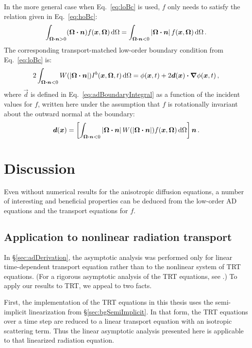 In the more general case when Eq.~\eqref{eq:loBc} is used, $f$ only needs to
satisfy the relation given in Eq.~\eqref{eq:hoBc}:
\begin{equation*}
  \int_{\bm{\Omega}\bm{\cdot}\bm{n} > 0} (\bm{\Omega}\bm{\cdot} \bm{n})
  f(\bm{x}, \bm{\Omega}) \mathop{}\!\mathrm{d}\Omega
  =
  \int_{\bm{\Omega}\bm{\cdot}\bm{n} < 0} \left| \bm{\Omega}\bm{\cdot} \bm{n} \right|
  f(\bm{x}, \bm{\Omega}) \mathop{}\!\mathrm{d}\Omega \,.
\end{equation*}
The corresponding transport-matched low-order boundary condition from
Eq.~\eqref{eq:loBc} is:
\begin{equation*}
2\int_{\bm{\Omega}\bm{\cdot}\bm{n} < 0} W(\left| \bm{\Omega}\bm{\cdot}\bm{n} \right|)
I^b(\bm{x},\bm{\Omega},t) \mathop{}\!\mathrm{d}\Omega
=
\phi(\bm{x},t)
+ 2 \bm{d}(\bm{x}) \bm{\cdot} \bm{\nabla} \phi(\bm{x},t)\,,
\end{equation*}
where $\vec{d}$ is defined in Eq.~\eqref{eq:adBoundaryIntegral} as a function
of the incident values for $f$, written here under the assumption that $f$ is
rotationally invariant about the outward normal at the boundary:
\begin{equation*}
  \bm{d}(\bm{x})
  = \left[ \int_{\bm{\Omega}\bm{\cdot}\bm{n} < 0}
  \left| \bm{\Omega}\bm{\cdot}\bm{n} \right| W(\left| \bm{\Omega}\bm{\cdot}\bm{n} \right|)
  f(\bm{x}, \bm{\Omega}) \mathop{}\!\mathrm{d}\Omega\right] \bm{n}\,.
\end{equation*}

\section{Discussion}
Even without numerical results for the anisotropic diffusion equations, a
number of interesting and beneficial properties can be deduced from the
low-order AD equations and the transport equations for $f$.

\subsection{Application to nonlinear radiation transport}
\label{sec:appNonlinear}

In \S\ref{sec:adDerivation}, the asymptotic analysis was performed only for
linear time-dependent transport equation rather than to the nonlinear system of
TRT equations. (For a rigorous asymptotic analysis of the TRT equations, see
\cite{Lar1983a}.) To apply our results to TRT, we appeal to two facts.

First, the implementation of the TRT equations in this thesis uses the
semi-implicit linearization from \S\ref{sec:bgSemiImplicit}. In that form, the
TRT equations over a time step are reduced to a linear transport equation with
an isotropic scattering term. Thus the linear asymptotic analysis presented here
is applicable to that linearized radiation equation.

